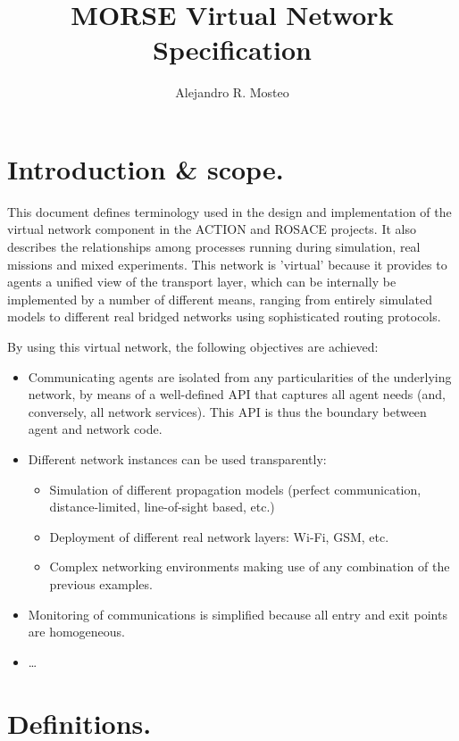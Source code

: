 \documentclass[a4paper,11pt]{article}
\newcommand{\myauthor}{Alejandro R. Mosteo}
\newcommand{\mytitle}{MORSE Virtual Network Specification}
\begin{document}
\author{\myauthor}
\title{\mytitle}
\maketitle

\section{Introduction \& scope.}

This document defines terminology used in the design and implementation of the virtual network component in the ACTION and ROSACE projects. It also describes the relationships among processes running during simulation, real missions and mixed experiments. This network is 'virtual' because it provides to agents a unified view of the transport layer, which can be internally be implemented by a number of different means, ranging from entirely simulated models to different real bridged networks using sophisticated routing protocols. 

By using this virtual network, the following objectives are achieved:

\begin{itemize}
    \item Communicating agents are isolated from any particularities of the underlying network, by means of a well-defined API that captures all agent needs (and, conversely, all network services). This API is thus the boundary between agent and network code.
    \item Different network instances can be used transparently:
        \begin{itemize}
            \item Simulation of different propagation models (perfect communication, distance-limited, line-of-sight based, etc.)
            \item Deployment of different real network layers: Wi-Fi, GSM, etc.
            \item Complex networking environments making use of any combination of the previous examples.
        \end{itemize}
    \item Monitoring of communications is simplified because all entry and exit points are homogeneous.
    \item \dots
\end{itemize}


\section{Definitions.}
\end{document}
